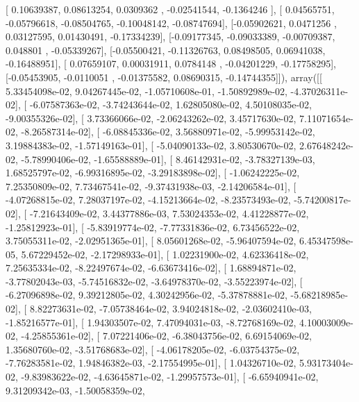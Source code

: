 \documentclass{article}
\begin{document}
       [ 0.10639387,  0.08613254,  0.0309362 , -0.02541544, -0.1364246 ],
       [ 0.04565751, -0.05796618, -0.08504765, -0.10048142, -0.08747694],
       [-0.05902621,  0.0471256 ,  0.03127595,  0.01430491, -0.17334239],
       [-0.09177345, -0.09033389, -0.00709387,  0.048801  , -0.05339267],
       [-0.05500421, -0.11326763,  0.08498505,  0.06941038, -0.16488951],
       [ 0.07659107,  0.00031911,  0.0784148 , -0.04201229, -0.17758295],
       [-0.05453905, -0.0110051 , -0.01375582,  0.08690315, -0.14744355]]), array([[  5.33454098e-02,   9.04267445e-02,  -1.05710608e-01,
         -1.50892989e-02,  -4.37026311e-02],
       [ -6.07587363e-02,  -3.74243644e-02,   1.62805080e-02,
          4.50108035e-02,  -9.00355326e-02],
       [  3.73366066e-02,  -2.06243262e-02,   3.45717630e-02,
          7.11071654e-02,  -8.26587314e-02],
       [ -6.08845336e-02,   3.56880971e-02,  -5.99953142e-02,
          3.19884383e-02,  -1.57149163e-01],
       [ -5.04090133e-02,   3.80530670e-02,   2.67648242e-02,
         -5.78990406e-02,  -1.65588889e-01],
       [  8.46142931e-02,  -3.78327139e-03,   1.68525797e-02,
         -6.99316895e-02,  -3.29183898e-02],
       [ -1.06242225e-02,   7.25350809e-02,   7.73467541e-02,
         -9.37431938e-03,  -2.14206584e-01],
       [ -4.07268815e-02,   7.28037197e-02,  -4.15213664e-02,
         -8.23573493e-02,  -5.74200817e-02],
       [ -7.21643409e-02,   3.44377886e-03,   7.53024353e-02,
          4.41228877e-02,  -1.25812923e-01],
       [ -5.83919774e-02,  -7.77331836e-02,   6.73456522e-02,
          3.75055311e-02,  -2.02951365e-01],
       [  8.05601268e-02,  -5.96407594e-02,   6.45347598e-05,
          5.67229452e-02,  -2.17298933e-01],
       [  1.02231900e-02,   4.62336418e-02,   7.25635334e-02,
         -8.22497674e-02,  -6.63673416e-02],
       [  1.68894871e-02,  -3.77802043e-03,  -5.74516832e-02,
         -3.64978370e-02,  -3.55223974e-02],
       [ -6.27096898e-02,   9.39212805e-02,   4.30242956e-02,
         -5.37878881e-02,  -5.68218985e-02],
       [  8.82273631e-02,  -7.05738464e-02,   3.94024818e-02,
         -2.03602410e-03,  -1.85216577e-01],
       [  1.94303507e-02,   7.47094031e-03,  -8.72768169e-02,
          4.10003009e-02,  -4.25855361e-02],
       [  7.07221406e-02,  -6.38043756e-02,   6.69154069e-02,
          1.35680760e-02,  -3.51768683e-02],
       [ -4.06178205e-02,  -6.03754375e-02,  -7.76283581e-02,
          1.94846382e-03,  -2.17554995e-01],
       [  1.04326710e-02,   5.93173404e-02,  -9.83983622e-02,
         -4.63645871e-02,  -1.29957573e-01],
       [ -6.65940941e-02,   9.31209342e-03,  -1.50058359e-02,
\end{document}
